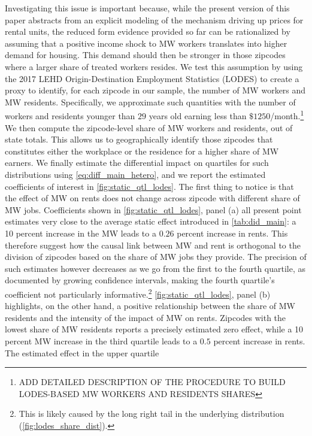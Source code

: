 Investigating this issue is important because, while the present version of this paper abstracts from an explicit modeling 
of the mechanism driving up prices for rental units, the reduced form evidence provided so far can be rationalized by 
assuming that a positive income shock to MW workers translates into higher demand for housing. This demand 
should then be stronger in those zipcodes where a larger share of treated workers resides. We test this assumption by 
using the 2017 LEHD Origin-Destination Employment Statistics (LODES) to create a proxy to identify, for each 
zipcode in our sample, the number of MW workers and MW residents. Specifically, we approximate such quantities
with the number of workers and residents younger than $29$ years old earning less than $\$1250$/month.\footnote{ADD 
	DETAILED DESCRIPTION OF THE PROCEDURE TO BUILD LODES-BASED MW WORKERS AND RESIDENTS SHARES}
We then compute the zipcode-level share of MW workers and residents, out of state totals. This allows us to 
geographically identify those zipcodes that constitutes either the workplace or the residence for a higher share
of MW earners. We finally estimate the differential impact on quartiles for such distributions 
using \autoref{eq:diff_main_hetero}, and we report the estimated coefficients of interest in \autoref{fig:static_qtl_lodes}.
The first thing to notice is that the effect of MW on rents does not change across zipcode with different
share of MW jobs. Coefficients shown in  \autoref{fig:static_qtl_lodes}, panel (a) all present point estimates
very close to the average static effect introduced in \autoref{tab:did_main}: a 10 percent increase in the MW leads
to a $0.26$ percent increase in rents. This therefore suggest how the causal link between MW and rent is orthogonal 
to the division of zipcodes based on the share of MW jobs they provide. The precision of such estimates however 
decreases as we go from the first to the fourth quartile, as documented by growing confidence intervals, making the 
fourth quartile's coefficient not particularly informative.\footnote{\label{ft:long_tail}This 
	is likely caused by the long right tail in the underlying distribution (\autoref{fig:lodes_share_dist}).}  
\autoref{fig:static_qtl_lodes}, panel (b) highlights, on the other hand, a positive relationship between the share of 
MW residents and the intensity of the impact of MW on rents.  Zipcodes with the lowest share of MW residents
reports a precisely estimated zero effect, while a 10 percent MW increase in the 
third quartile leads to a $0.5$ percent increase in rents. The estimated effect in the upper quartile 
